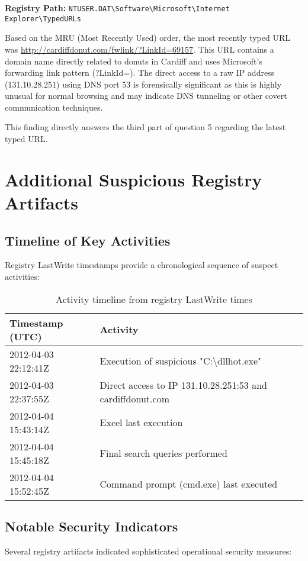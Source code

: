 \textbf{Registry Path:} \texttt{NTUSER.DAT\textbackslash Software\textbackslash Microsoft\textbackslash Internet Explorer\textbackslash TypedURLs}

Based on the MRU (Most Recently Used) order, the most recently typed URL was \url{http://cardiffdonut.com/fwlink/?LinkId=69157}. This URL contains a domain name directly related to donuts in Cardiff and uses Microsoft's forwarding link pattern (?LinkId=). The direct access to a raw IP address (131.10.28.251) using DNS port 53 is forensically significant as this is highly unusual for normal browsing and may indicate DNS tunneling or other covert communication techniques.

This finding directly answers the third part of question 5 regarding the latest typed URL.

\section{Additional Suspicious Registry Artifacts}

\subsection{Timeline of Key Activities}
Registry LastWrite timestamps provide a chronological sequence of suspect activities:

\begin{table}[htbp]
    \centering
    \begin{tabular}{|p{4cm}|p{9cm}|}
        \hline
        \textbf{Timestamp (UTC)} & \textbf{Activity} \\
        \hline
        2012-04-03 22:12:41Z & Execution of suspicious "C:\textbackslash dllhot.exe" \\
        \hline
        2012-04-03 22:37:55Z & Direct access to IP 131.10.28.251:53 and cardiffdonut.com \\
        \hline
        2012-04-04 15:43:14Z & Excel last execution \\
        \hline
        2012-04-04 15:45:18Z & Final search queries performed \\
        \hline
        2012-04-04 15:52:45Z & Command prompt (cmd.exe) last executed \\
        \hline
    \end{tabular}
    \caption{Activity timeline from registry LastWrite times}
    \label{tab:activity_timeline}
\end{table}

\subsection{Notable Security Indicators}
Several registry artifacts indicated sophisticated operational security measures:

